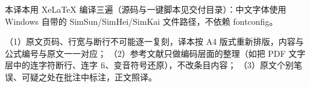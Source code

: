 本译本用 XeLaTeX 编译三遍（源码与一键脚本见交付目录）：中文字体使用 Windows 自带的
SimSun/SimHei/SimKai 文件路径，不依赖 fontconfig。

（1）原文页码、行宽与断行不可能逐一复刻，译本按 A4 版式重新排版，内容与公式编号与原文一一对应；
（2）参考文献只做编码层面的整理（如把 PDF 文字层中的连字符断行、连字 ﬁ、变音符号还原），不改条目内容；
（3）原文个别笔误、可疑之处在批注中标注，正文照译。
